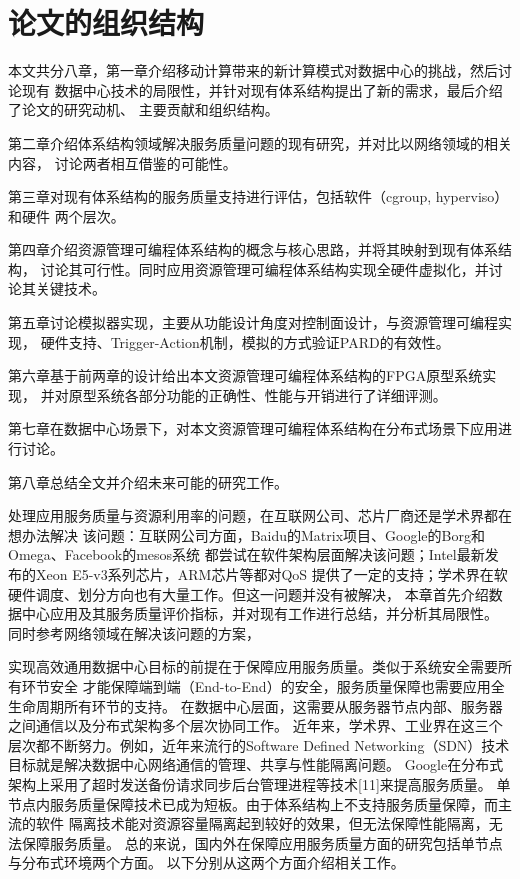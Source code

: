 \section{论文的组织结构}

本文共分八章，第一章介绍移动计算带来的新计算模式对数据中心的挑战，然后讨论现有
数据中心技术的局限性，并针对现有体系结构提出了新的需求，最后介绍了论文的研究动机、
主要贡献和组织结构。

第二章介绍体系结构领域解决服务质量问题的现有研究，并对比以网络领域的相关内容，
讨论两者相互借鉴的可能性。

第三章对现有体系结构的服务质量支持进行评估，包括软件（cgroup, hyperviso）和硬件
两个层次。

第四章介绍资源管理可编程体系结构的概念与核心思路，并将其映射到现有体系结构，
讨论其可行性。同时应用资源管理可编程体系结构实现全硬件虚拟化，并讨论其关键技术。

第五章讨论模拟器实现，主要从功能设计角度对控制面设计，与资源管理可编程实现，
硬件支持、Trigger-Action机制，模拟的方式验证PARD的有效性。

第六章基于前两章的设计给出本文资源管理可编程体系结构的FPGA原型系统实现，
并对原型系统各部分功能的正确性、性能与开销进行了详细评测。

第七章在数据中心场景下，对本文资源管理可编程体系结构在分布式场景下应用进行讨论。

第八章总结全文并介绍未来可能的研究工作。


处理应用服务质量与资源利用率的问题，在互联网公司、芯片厂商还是学术界都在想办法解决
该问题：互联网公司方面，Baidu的Matrix项目、Google的Borg和Omega、Facebook的mesos系统
都尝试在软件架构层面解决该问题；Intel最新发布的Xeon E5-v3系列芯片，ARM芯片等都对QoS
提供了一定的支持；学术界在软硬件调度、划分方向也有大量工作。但这一问题并没有被解决，
本章首先介绍数据中心应用及其服务质量评价指标，并对现有工作进行总结，并分析其局限性。
同时参考网络领域在解决该问题的方案，

实现高效通用数据中心目标的前提在于保障应用服务质量。类似于系统安全需要所有环节安全
才能保障端到端（End-to-End）的安全，服务质量保障也需要应用全生命周期所有环节的支持。
在数据中心层面，这需要从服务器节点内部、服务器之间通信以及分布式架构多个层次协同工作。
近年来，学术界、工业界在这三个层次都不断努力。例如，近年来流行的Software Defined
Networking（SDN）技术\cite{SDN}目标就是解决数据中心网络通信的管理、共享与性能隔离问题。
Google在分布式架构上采用了超时发送备份请求同步后台管理进程等技术[11]来提高服务质量。
单节点内服务质量保障技术已成为短板。由于体系结构上不支持服务质量保障，而主流的软件
隔离技术能对资源容量隔离起到较好的效果，但无法保障性能隔离，无法保障服务质量。
总的来说，国内外在保障应用服务质量方面的研究包括单节点与分布式环境两个方面。
以下分别从这两个方面介绍相关工作。



